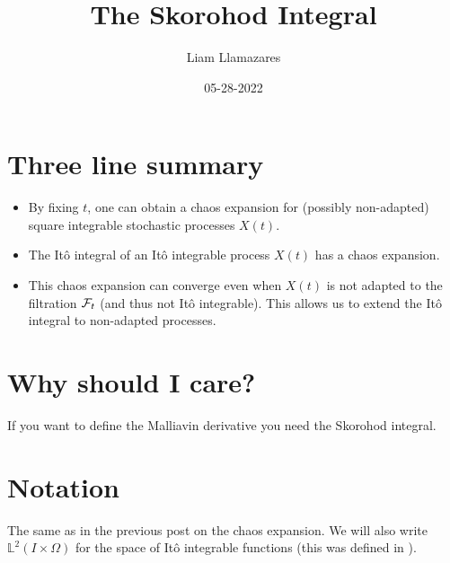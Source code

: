 \documentclass[12pt]{article}
\begin{document}
\title{The Skorohod Integral}
\author{Liam Llamazares}
\date{05-28-2022}
\maketitle
\section{ Three line summary}
\begin{itemize}
	\item By fixing $t$, one can obtain a chaos expansion for (possibly non-adapted) square integrable stochastic processes $X(t)$.
	\item The Itô integral of an Itô integrable process $X(t)$ has a chaos expansion.
	\item This chaos expansion can converge even when $X(t)$ is not adapted to the filtration $\mathcal{F}_t$ (and thus not Itô integrable). This allows us to extend the Itô integral to non-adapted processes.
\end{itemize}
\section{Why should I care?}
If you want to define the Malliavin derivative you need the Skorohod integral.
\section{Notation}
The same as in the previous post \cite{Chaosblog} on the chaos expansion. We will also write $\mathbb{L}^2(I\times \Omega)$ for the space of Itô integrable functions (this was defined in \cite{Itointblog}).
\end{document}
